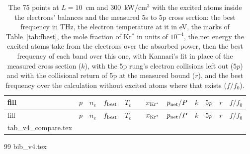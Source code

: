 \documentclass[11pt]{article}
\makeatletter
\newcommand{\tabinput}[1]{\@@input #1 }
\makeatother
\begin{document}
\begingroup
\footnotesize
\setlength{\tabcolsep}{3pt}
\begin{longtable}{@{}llrrrlrrrrrr@{}}
\caption{The 75 points at $L=10$~cm and 300~kW/cm$^3$ with the excited atoms inside the electrons' balances and the
measured 5s to 5p cross section: the best frequency in THz, the electron temperature at it in eV, the marks of
Table~\ref{tab:fbest}, the mole fraction of Kr$^*$ in units of $10^{-4}$, the net energy the excited atoms take from
the electrons over the absorbed power, then the best frequency of each band over this one, with Kannari's fit in
place of the measured cross section ($k$), with the 5p rung's electron collisions left out ($5p$) and with the
collisional return of 5p at the measured bound ($r$), and the best frequency over the calculation without excited
atoms where that exists ($f/f_0$).}\label{tab:compare}\\
\toprule
fill & $p$ & $n_e$ & $f_{\rm best}$ & $T_e$ & & $x_{{\rm Kr}^*}$ & $p_{\rm net}/P$ & $k$ & $5p$ & $r$ & $f/f_0$ \\
\midrule
\endfirsthead
\toprule
fill & $p$ & $n_e$ & $f_{\rm best}$ & $T_e$ & & $x_{{\rm Kr}^*}$ & $p_{\rm net}/P$ & $k$ & $5p$ & $r$ & $f/f_0$ \\
\midrule
\endhead
\tabinput{tab_v4_compare.tex}
\bottomrule
\end{longtable}
\endgroup

\begin{thebibliography}{99}
\tabinput{bib_v4.tex}
\end{thebibliography}
\end{document}
